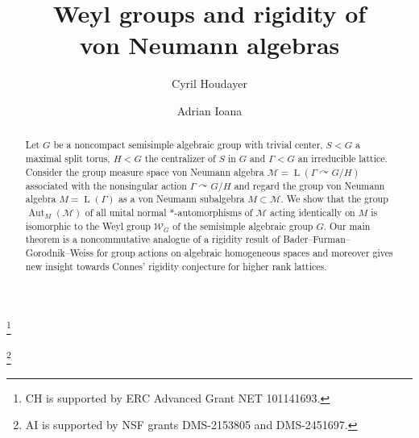 \documentclass[11pt]{amsart}
\title[Weyl groups and rigidity of von Neumann algebras]{Weyl groups and rigidity of \\ von Neumann algebras}
\numberwithin{equation}{section}
\theoremstyle{plain}
\theoremstyle{definition}
\newcommand{\Aut}{\operatorname{Aut}}
\newcommand{\rL}{\operatorname{ L}}
\begin{document}
\begin{abstract}
Let $G$ be a noncompact semisimple algebraic group with trivial center, $S < G$ a maximal split torus, $H < G$ the centralizer of $S$ in $G$ and $\Gamma < G$ an irreducible lattice. Consider the group measure space von Neumann algebra $\mathscr M = \rL(\Gamma \curvearrowright G/H)$ associated with the nonsingular action $\Gamma \curvearrowright G/H$ and regard the group von Neumann algebra $M = \rL(\Gamma)$ as a von Neumann subalgebra $M \subset \mathscr M$. We show that the group $\Aut_M(\mathscr M)$ of all unital normal $\ast$-automorphisms of $\mathscr M$ acting identically on $M$ is isomorphic to the Weyl group $\mathscr W_G$ of the semisimple algebraic group $G$. Our main theorem is a noncommutative analogue of a rigidity result of Bader--Furman--Gorodnik--Weiss  for group actions on algebraic homogeneous spaces and moreover gives new insight towards Connes'\! rigidity conjecture for higher rank lattices.
\end{abstract}



\author{Cyril Houdayer}
\address{\'Ecole normale sup\'erieure \\ D\'epartement de math\'ematiques et applications \\ Universit\'e Paris-Saclay \\ 45 rue d'Ulm \\ 75230 Paris Cedex 05 \\ FRANCE}
\thanks{CH is supported by ERC Advanced Grant NET 101141693.}


\author{Adrian Ioana}
\address{Department of Mathematics \\ University of California at San Diego \\ 9500 Gilman Drive \\ La Jolla \\ CA
92093 \\ USA}
\thanks{AI is supported by NSF grants DMS-2153805 and DMS-2451697.}






\maketitle
\end{document}
